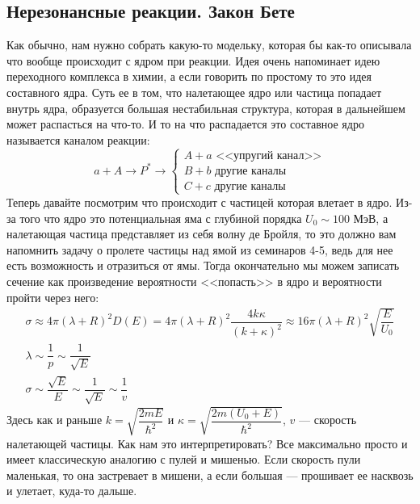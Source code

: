 \documentclass[12pt]{article}
\begin{document}
\subsection{Нерезонансные реакции. Закон Бете}
Как обычно, нам нужно собрать какую-то модельку, которая бы как-то описывала что вообще происходит с ядром при реакции. Идея очень напоминает идею переходного комплекса в химии, а если говорить по простому то это идея составного ядра. Суть ее в том, что налетающее ядро или частица попадает внутрь ядра, образуется большая нестабильная структура, которая в дальнейшем может распасться на что-то. И то на что распадается это составное ядро называется каналом реакции:
\begin{equation*}
    a + A \rightarrow P^* \rightarrow 
    \begin{cases}
         A + a \text{ <<упругий канал>>}\\
         B + b \text{ другие каналы}\\
         C + c \text{ другие каналы}
    \end{cases}
\end{equation*}
Теперь давайте посмотрим что происходит с частицей которая влетает в ядро. Из-за того что ядро это потенциальная яма с глубиной порядка $U_0 \sim 100$ МэВ, а налетающая частица представляет из себя волну де Бройля, то это должно вам напомнить задачу о пролете частицы над ямой из семинаров 4-5, ведь для нее есть возможность и отразиться от ямы. Тогда окончательно мы можем записать сечение как произведение вероятности <<попасть>> в ядро и вероятности пройти через него:
\begin{gather*}
    \sigma \approx 4\pi (\lambda + R)^2 D(E) = 4\pi (\lambda + R)^2 \dfrac{4k\kappa}{(k+\kappa)^2} \approx 16\pi (\lambda + R)^2 \sqrt{\dfrac{E}{U_0}}\\
    \lambda \sim \dfrac{1}{p} \sim \dfrac{1}{\sqrt{E}}\\
    \sigma \sim \dfrac{\sqrt{E}}{E} \sim \dfrac{1}{\sqrt{E}} \sim \dfrac{1}{v}
\end{gather*}
Здесь как и раньше $k = \sqrt{\dfrac{2mE}{\hbar^2}}$ и $ \kappa = \sqrt{\dfrac{2m(U_0 + E)}{\hbar^2}}$, $v$ --- скорость налетающей частицы. Как нам это интерпретировать? Все максимально просто и имеет классическую аналогию с пулей и мишенью. Если скорость пули маленькая, то она застревает в мишени, а если большая --- прошивает ее насквозь и улетает, куда-то дальше. 
\end{document}
